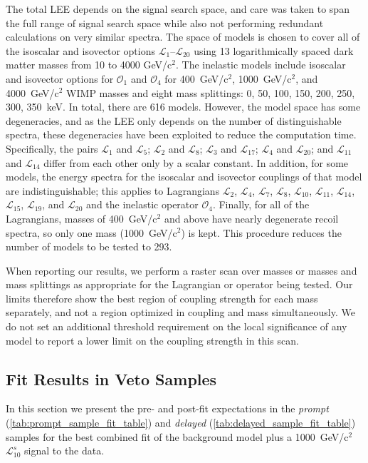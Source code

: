 The total LEE depends on the signal search space, and care was taken to span the full range of signal search space while also not performing redundant calculations on very similar spectra.
The space of models is chosen to cover all of the isoscalar and isovector options $\mathcal{L}_1$--$\mathcal{L}_{20}$ using 13 logarithmically spaced dark matter masses from 10 to 4000 GeV/c$^2$. 
The inelastic models include isoscalar and isovector options for $\mathcal{O}_1$ and $\mathcal{O}_4$ for 400~GeV/c$^2$, 1000~GeV/c$^2$, and 4000~GeV/c$^2$ WIMP masses and eight mass splittings: 0, 50, 100, 150, 200, 250, 300, 350~keV. 
In total, there are 616 models. 
However, the model space has some degeneracies, and as the LEE only depends on the number of distinguishable spectra, these degeneracies have been exploited to reduce the computation time.
Specifically, the pairs $\mathcal{L}_1$ and $\mathcal{L}_5$; $\mathcal{L}_2$ and $\mathcal{L}_8$; $\mathcal{L}_3$ and $\mathcal{L}_{17}$; $\mathcal{L}_4$ and $\mathcal{L}_{20}$; and $\mathcal{L}_{11}$ and $\mathcal{L}_{14}$ differ from each other only by a scalar constant. 
In addition, for some models, the energy spectra for the isoscalar and isovector couplings of that model are indistinguishable; this applies to Lagrangians $\mathcal{L}_2$, $\mathcal{L}_4$, $\mathcal{L}_7$, $\mathcal{L}_8$, $\mathcal{L}_{10}$, $\mathcal{L}_{11}$, $\mathcal{L}_{14}$, $\mathcal{L}_{15}$, $\mathcal{L}_{19}$, and $\mathcal{L}_{20}$ and the inelastic operator $\mathcal{O}_4$.
Finally, for all of the Lagrangians, masses of  400~GeV/c$^2$ and above have nearly degenerate recoil spectra, so only one mass (1000~GeV/c$^2$) is kept. 
This procedure reduces the number of models to be tested to 293.

When reporting our results, we perform a raster scan over masses or masses and mass splittings as appropriate for the Lagrangian or operator being tested. Our limits therefore show the best region of coupling strength for each mass separately, and not a region optimized in coupling and mass simultaneously. We do not set an additional threshold requirement on the local significance of any model to report a lower limit on the coupling strength in this scan. 


\subsection{Fit Results in Veto Samples}
In this section we present the pre- and post-fit expectations in the \emph{prompt} (\autoref{tab:prompt_sample_fit_table}) and \emph{delayed} (\autoref{tab:delayed_sample_fit_table}) samples for the best combined fit of the background model plus a 1000~GeV/c$^2$ $\mathcal{L}_{10}^s$ signal to the data. 


